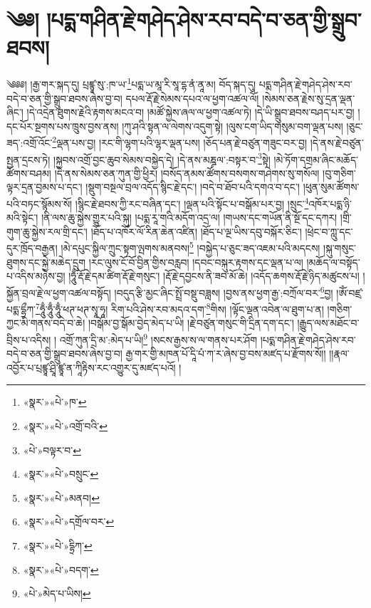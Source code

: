 \chapter{༄༅། །པདྨ་གཤིན་རྗེ་གཤེད་ཤེས་རབ་བདེ་བ་ཅན་གྱི་སྒྲུབ་ཐབས།}༄༅༅། །རྒྱ་གར་སྐད་དུ། པྲཛྙཱ་སུ་:ཁ་ཡ་\footnote{«སྣར་»«པེ་»ཁ་}པདྨ་ཡ་མཱ་རི་སཱ་དྷ་ནཾ་ནཱ་མ། བོད་སྐད་དུ། པདྨ་གཤིན་རྗེ་གཤེད་ཤེས་རབ་བདེ་བ་ཅན་གྱི་སྒྲུབ་ཐབས་ཞེས་བྱ་བ། དཔལ་རྡོ་རྗེ་སེམས་དཔའ་ལ་ཕྱག་འཚལ་ལོ། །སེམས་ཅན་རྗེས་སུ་དྲན་ལྡན་ཞིང་། །དེ་འདྲེན་ཐུགས་རྗེའི་རྟགས་མངའ་བ། །མཚོ་སྐྱེས་ཞལ་ལ་ཕྱག་འཚལ་ཏེ། །དེ་ཡི་སྒྲུབ་ཐབས་བཤད་པར་བྱ། །དང་པོར་སྔགས་པས་ཁྲུས་བྱས་ནས། །ཀུ་ཤའི་སྟན་ལ་ལེགས་འདུག་སྟེ། །ལུས་ངག་ཡིད་གསུམ་བག་ལྡན་པས། །ཅུང་ཟད་:འགྲོ་འོང་\footnote{«སྣར་»«པེ་»འགྲོ་བའི་}ལྡན་པས་བྱ། །རང་གི་ལྷག་པའི་ལྷར་ལྡན་པས། །ཅོད་པན་རྗེ་བཙུན་གཟུང་བར་བྱ། །དེ་ནས་རྗེ་བཙུན་སྤྱན་དྲངས་ཏེ། །སྐྱབས་འགྲོ་བྱང་ཆུབ་སེམས་བསྐྱེད་དེ། །དེ་ནས་མཎྜལ་:བསྟར་བ་\footnote{«པེ་»བལྟར་བ་}སྟེ། །མེ་ཏོག་དགྲམ་ཞིང་མཆོད་ཚོགས་བཤམ། །དེ་ནས་སེམས་ཅན་ཀུན་གྱི་ཕྱིར། །བསོད་ནམས་ཚོགས་བསགས་གཤེགས་སུ་གསོལ། །བུ་གཅིག་ལྟར་དྲན་བྱམས་པ་དང་། །སྡུག་བསྔལ་བྲལ་འདོད་སྙིང་རྗེ་དང་། །བདེ་བ་ཐོབ་པའི་དགའ་བ་དང་། །ཕུན་སུམ་ཚོགས་པའི་བཏང་སྙོམས་སོ། །སྙིང་རྗེ་ཐབས་ཀྱི་རང་བཞིན་དང་། །ལྡན་པའི་སྟོང་པ་བསྒོམ་པར་བྱ། །སྲུང་\footnote{«སྣར་»«པེ་»བསྲུང་}འཁོར་པདྨ་ཉི་མའི་སྟེང་། །ནི་ལས་ཆུ་སྐྱེས་གྱུར་པའི་སྐུ། །པདྨ་རཱ་གའི་མདོག་འདྲ་ལ། །གཡས་དང་གཡོན་ནི་སྔོ་དང་དཀར། །གྲི་གུག་ཆུ་སྐྱེས་རལ་གྲི་དང་། །ཐོད་པ་འཁོར་ལོ་རིན་ཆེན་འཛིན། །ཐོད་པ་ལྔ་ཡིས་དབུ་བསྐོར་ཅིང་། །ཕྲེང་བ་ཀླུ་དང་དུར་ཁྲོད་བརྒྱན། །མེ་དཔུང་སྐྱིལ་ཀྲུང་སྟག་ལྤགས་མནབས།\footnote{«སྣར་»«པེ་»མནབ།} །བསྐྱེད་པ་ཅུང་ཟད་འཇམ་པའི་མདངས། །སྐུ་གསུང་ཐུགས་དང་སྐྱེ་མཆེད་དྲུག །རང་ལུས་ངོ་བོ་བྱིན་གྱིས་བརླབ། །དབང་བསྐུར་རྟགས་དང་ལྡན་པ་ལ། །མཆོད་ལ་བསྟོད་པ་འདིས་མཉེས་བྱ། །ཧཱུྃ་རྡོ་རྗེ་དམ་ཚིག་རྡོ་རྗེ་གསུང་། །རྡོ་རྗེ་དབྱངས་ནི་ཟབ་མོ་ཆེ། །འདོད་ཆགས་རྡོ་རྗེ་ཉིད་མཚུངས་པ། །སྐྱོན་བྲལ་རྗེ་ལ་ཕྱག་འཚལ་བསྟོད། །བདུད་རྩི་མྱང་ཞིང་སྤྲོ་བསྡུ་བཟླས། །བྱས་ནས་ཕྱག་རྒྱ་:བཀྲོལ་བར་\footnote{«སྣར་»«པེ་»དགྲོལ་བར་}བྱ། །ཨོཾ་བཛྲ་པདྨ་དྷྲྀཀ་\footnote{«སྣར་»«པེ་»དྷྲིཀ་}ཧཱུྃ་ཧཱུྃ་ཧཱུྃ་ཕཊ་ཕཊ་སྭཱ་ཧཱ། རིག་པའི་ཤེས་རབ་མདའ་དག་\footnote{«སྣར་»«པེ་»བདག་}གིས། །ལྟོང་ལྡན་འབེན་ལ་ཐུག་པ་ན། །གཅིག་ཀྱང་མི་གནས་བདེ་བ་ཆེ། །བསྒོམ་བྱ་སྒོམ་བྱེད་མེད་པ་ཡི། །རྗེ་བཙུན་གསུང་གི་དྲིན་དག་དང་། །རྒྱུད་ལས་མཐོང་བ་བྲིས་པ་འདིས། །
འགྲོ་ཀུན་དྲི་མ་:མེད་པ་ཡི།\footnote{«པེ་»མེད་པ་ཡིས།} །སངས་རྒྱས་ས་ལ་གནས་པར་ཤོག །པདྨ་གཤིན་རྗེ་གཤེད་ཤེས་རབ་བདེ་བ་ཅན་གྱི་སྒྲུབ་ཐབས་ཞེས་བྱ་བ། རྒྱ་གར་གྱི་མཁན་པོ་དཱི་པཾ་ཀ་ར་ཞེས་བྱ་བས་མཛད་པ་རྫོགས་སོ།། །།རྣལ་འབྱོར་པ་པྲཛྙཱ་ཤྲཱི་ཛྙཱ་ན་ཀཱིརྟིས་རང་འགྱུར་དུ་མཛད་པའོ། ། 